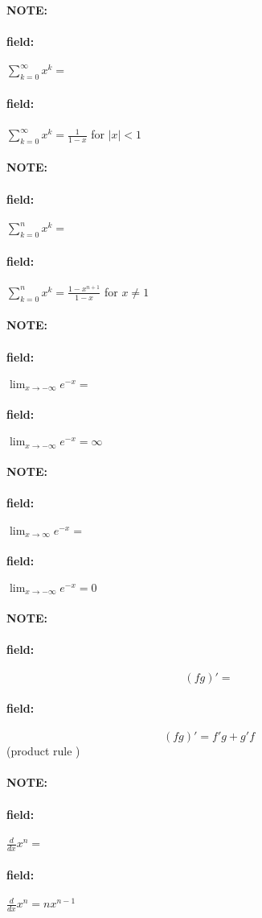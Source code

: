 \documentclass[12pt]{article}
\newenvironment{note}{\paragraph{NOTE:}}{}
\newenvironment{field}{\paragraph{field:}}{}
\begin{document}
\begin{note}
  \begin{field}
    $\sum_{k=0}^\infty x^k = $
  \end{field}
  \begin{field}
    $\sum_{k=0}^\infty x^k = \frac{1}{1-x}$ for $|x| < 1$
  \end{field}
\end{note}


\begin{note}
  \begin{field}
    $\sum_{k=0}^n x^k =$
  \end{field}
  \begin{field}
    $\sum_{k=0}^n x^k = \frac{1 - x^{n+1}}{1-x}$ for $x \neq 1$
  \end{field}
\end{note}

\begin{note}
  \begin{field}
    $\lim_{x \to -\infty} e^{-x} = $
  \end{field}
  \begin{field}
    $\lim_{x \to -\infty} e^{-x} = \infty$
  \end{field}
\end{note}

\begin{note}
  \begin{field}
    $\lim_{x \to \infty} e^{-x} = $
  \end{field}
  \begin{field}
    $\lim_{x \to -\infty} e^{-x} = 0$
  \end{field}
\end{note}

\begin{note}
  \begin{field}
    $$ (fg)' = $$
  \end{field}
  \begin{field}
    $$ (fg)' = f'g + g'f$$ (product rule )
  \end{field}
\end{note}

\begin{note}
  \begin{field}
    $\frac{d}{dx} x^n = $
  \end{field}
  \begin{field}
    $\frac{d}{dx} x^n = nx^{n-1}$
  \end{field}
\end{note}
\end{document}
